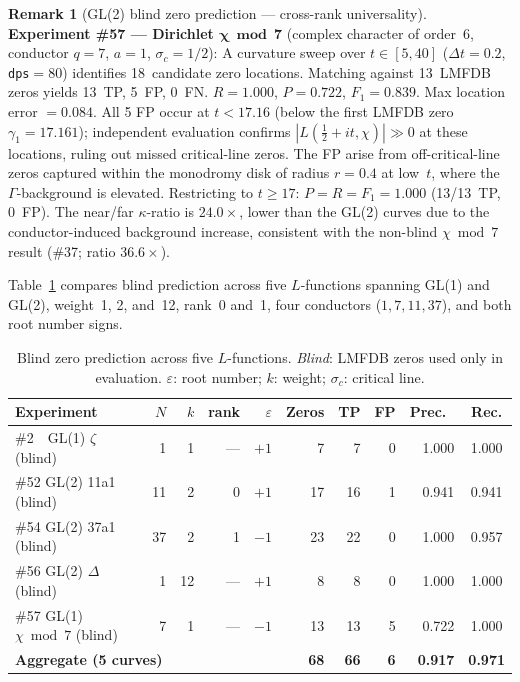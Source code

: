 \documentclass[11pt, a4paper]{article}
\theoremstyle{definition}
\newtheorem{remark}{Remark}[section]
\theoremstyle{plain}
\begin{document}
\begin{remark}[GL(2) blind zero prediction --- cross-rank universality]
\textbf{Experiment \#57 --- Dirichlet $\boldsymbol{\chi\bmod 7}$}
(complex character of order~6, conductor $q=7$, $a=1$, $\sigma_c = 1/2$):
A curvature sweep over $t\in[5,40]$ ($\Delta t = 0.2$, \texttt{dps}$=80$)
identifies 18~candidate zero locations.  Matching against 13~LMFDB zeros
yields 13~TP, 5~FP, 0~FN.
$R = 1.000$, $P = 0.722$, $F_1 = 0.839$.  Max location error $= 0.084$.
All 5 FP occur at $t < 17.16$ (below the first LMFDB zero $\gamma_1 = 17.161$);
independent evaluation confirms $|L(\tfrac{1}{2}+it, \chi)| \gg 0$
at these locations, ruling out missed critical-line zeros.
The FP arise from off-critical-line zeros captured within the monodromy
disk of radius $r = 0.4$ at low~$t$, where the $\Gamma$-background
is elevated.
Restricting to $t \geq 17$: $P = R = F_1 = 1.000$ (13/13~TP, 0~FP).
The near/far $\kappa$-ratio is $24.0\times$, lower than the GL(2) curves
due to the conductor-induced background increase, consistent with the
non-blind $\chi\bmod 7$ result (\#37; ratio $36.6\times$).

Table~\ref{tab:gl1_gl2_blind} compares blind prediction
across five $L$-functions spanning GL(1) and GL(2),
weight~1, 2, and~12, rank~0 and~1,
four conductors ($1, 7, 11, 37$), and both root number signs.

\begin{table}[ht]
\centering
\caption{Blind zero prediction across five $L$-functions.
  \emph{Blind}: LMFDB zeros used only in evaluation.
  $\varepsilon$: root number; $k$: weight; $\sigma_c$: critical line.}
\label{tab:gl1_gl2_blind}
\small
\begin{tabular}{lrrrrrrrrc}
\toprule
Experiment & $N$ & $k$ & rank & $\varepsilon$ & Zeros & TP & FP & Prec.\ & Rec. \\
\midrule
\#2\ \ GL(1) $\zeta$ (blind) & 1 & 1 & --- & $+1$ & 7 & 7 & 0 & 1.000 & 1.000 \\
\#52 GL(2) 11a1 (blind) & 11 & 2 & 0 & $+1$ & 17 & 16 & 1 & 0.941 & 0.941 \\
\#54 GL(2) 37a1 (blind) & 37 & 2 & 1 & $-1$ & 23 & 22 & 0 & 1.000 & 0.957 \\
\#56 GL(2) $\Delta$ (blind) & 1 & 12 & --- & $+1$ & 8 & 8 & 0 & 1.000 & 1.000 \\
\#57 GL(1) $\chi\bmod 7$ (blind) & 7 & 1 & --- & $-1$ & 13 & 13 & 5 & 0.722 & 1.000 \\
\midrule
\multicolumn{5}{l}{\textbf{Aggregate (5 curves)}} & \textbf{68} & \textbf{66} & \textbf{6} & \textbf{0.917} & \textbf{0.971} \\
\bottomrule
\end{tabular}
\end{table}


\end{remark}
\end{document}
